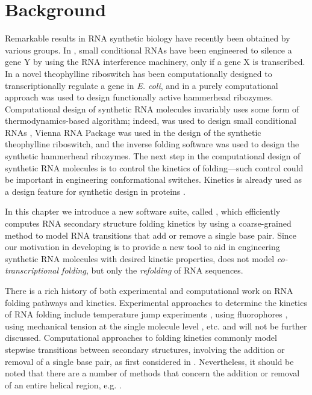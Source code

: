 \section{Background}
\label{sec:hermes:bkgrnd}

Remarkable results in RNA synthetic biology have recently been
obtained by various groups. In \citep{hochrein.jacs13}, small
conditional RNAs have been engineered to silence a gene Y by using the
RNA interference machinery, only if a gene X is transcribed. In
\citep{wachsmuth.nar13} a novel theophylline riboswitch has been
computationally designed to transcriptionally regulate a gene in
{\em E. coli}, and in \citep{synthetichammerheads} a purely computational
approach was used to design functionally active hammerhead ribozymes.
Computational design of synthetic RNA molecules invariably uses some
form of thermodynamics-based algorithm; indeed, 
\citep{zadeh.jcc11} was used to design small conditional RNAs
\citep{hochrein.jacs13}, Vienna RNA Package \citep{gruber08} was used in
the design of the synthetic theophylline riboswitch, and the
 inverse folding software
\citep{garcia.jbcbb13,garciamartin.nar13} was used to design the
synthetic hammerhead ribozymes. The next step in the computational
design of synthetic RNA molecules is to control the kinetics of
folding---such control could be important in engineering
conformational switches. Kinetics is already used as a design feature
for synthetic design in proteins \citep{bujotzek.jcam11,fasting.acie12}.

In this chapter we introduce a new software suite, called \hermes,
which efficiently computes RNA secondary structure
folding kinetics by using a coarse-grained
method to model RNA transitions that add or remove a single base pair.
Since our motivation in developing \hermes is to provide a new
tool to aid in engineering synthetic RNA molecules with desired
kinetic properties, \hermes does not model {\em co-transcriptional
folding}, but only the {\em refolding} of RNA sequences.

There is a rich history of both experimental and computational work on
RNA folding pathways and kinetics. Experimental approaches to
determine the kinetics of RNA folding include temperature jump
experiments \citep{lecuyercrothers}, using fluorophores
\citep{hobartner.jmb03}, using mechanical tension at the single
molecule level \citep{vieregg.mp06}, etc. and will not be further
discussed. Computational approaches to folding kinetics commonly model
stepwise transitions between secondary structures,
involving the addition or removal of a single base
pair, as first considered in \citep{flammhofacker}.
Nevertheless, it should be noted that there are a number of
methods that concern the addition or removal of an entire helical
region, e.g. \citep{huang.bb14,zhao.jcp11}.

